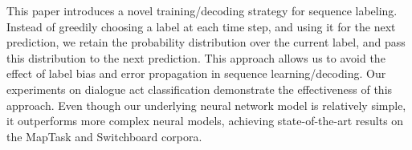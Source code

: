 This paper introduces a novel training/decoding strategy for sequence labeling. Instead of greedily choosing a label at each time step, and using it for the next prediction, we retain the probability distribution over the current label, and pass this distribution to the next prediction. This approach allows us to avoid the effect of label bias and error propagation in sequence learning/decoding. Our experiments on dialogue act classification demonstrate the effectiveness of this approach. Even though our underlying neural network model is relatively simple, it outperforms more complex neural models, achieving state-of-the-art results on the MapTask and Switchboard corpora.
